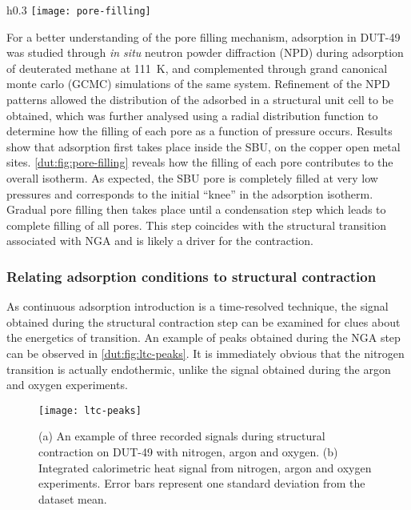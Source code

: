 \begin{wrapfigure}{h}{0.3\textwidth}
	\centering
	\texttt{[image: pore-filling]}%
    \caption{A dissection of the  isotherm
    at \SI{111}{\kelvin} 
    in components of adsorption in each type of pore.}%
	\label{dut:fig:pore-filling}
\end{wrapfigure}
For a better understanding of the pore filling mechanism, adsorption
in DUT-49 was studied through \textit{in situ} neutron powder diffraction
(NPD) during adsorption of deuterated methane  at \SI{111}{\kelvin},
and complemented through grand canonical monte carlo (GCMC) simulations
of the same system. Refinement of the NPD patterns allowed the distribution
of the adsorbed  in a structural unit cell to be obtained, which
was further analysed using a radial distribution function to determine
how the filling of each pore as a function of pressure occurs. 
Results show that adsorption first takes place inside the SBU,
on the copper open metal sites. 
\autoref{dut:fig:pore-filling} reveals how
the filling of each pore contributes to the overall isotherm.
As expected, the SBU pore is completely filled at very low pressures
and corresponds to the initial ``knee'' in the adsorption isotherm. Gradual
pore filling then takes place until a condensation step which 
leads to complete filling of all pores. This step coincides with 
the structural transition associated with NGA and is likely a driver 
for the contraction.

\subsubsection{Relating adsorption conditions to structural contraction}

As continuous adsorption introduction is a time-resolved technique, 
the signal obtained during the structural contraction step can 
be examined for clues about the energetics of transition. An example 
of peaks obtained during the NGA step can be observed in 
\autoref{dut:fig:ltc-peaks}. It is immediately obvious that 
the nitrogen transition is actually endothermic, unlike the 
signal obtained during the argon and oxygen experiments.

\begin{figure}[htb]
    \centering
    \texttt{[image: ltc-peaks]}%
    \caption{(a) An example of three recorded signals during 
    structural contraction on DUT-49 with nitrogen, argon and 
    oxygen. (b) Integrated calorimetric heat signal from 
    nitrogen, argon and oxygen experiments. Error bars 
    represent one standard deviation from the dataset mean.}%
    \label{dut:fig:ltc-peaks}
\end{figure}

